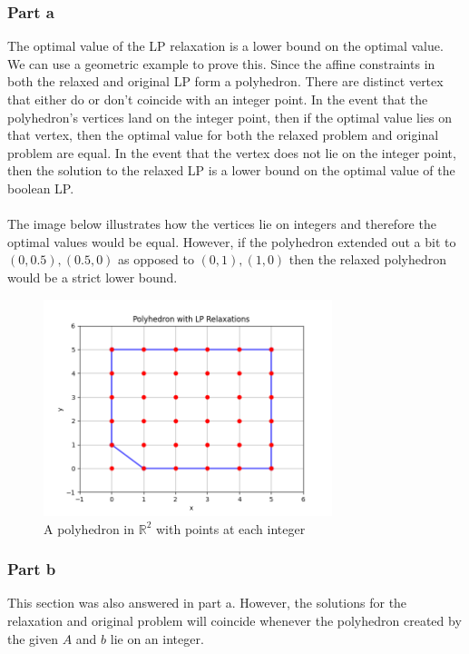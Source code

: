\subsubsection{Part a}
The optimal value of the LP relaxation is a lower bound on the optimal value. We can use a geometric example to prove this. Since the affine constraints in both the relaxed and original LP form a polyhedron. There are distinct vertex that either do or don't coincide with an integer point. In the event that the polyhedron's vertices land on the integer point, then if the optimal value lies on that vertex, then the optimal value for both the relaxed problem and original problem are equal. In the event that the vertex does not lie on the integer point, then the solution to the relaxed LP is a lower bound on the optimal value of the boolean LP.  \\ \\
The image below illustrates how the vertices lie on integers and therefore the optimal values would be equal. However, if the polyhedron extended out a bit to $(0,0.5),(0.5,0)$ as opposed to $(0,1),(1,0)$ then the relaxed polyhedron would be a strict lower bound.
\begin{figure}[htbp]
  \centerline{\includegraphics[width=0.75\textwidth]{hw5/lp_relaxed_polyhedron.png}}
  \caption{A polyhedron in $\mathbb{R}^2$ with points at each integer}
  \label{fig:lp_relaxed_polyhedron}
\end{figure} 
\subsubsection{Part b}
This section was also answered in part a. However, the solutions for the relaxation and original problem will coincide whenever the polyhedron created by the given $A$ and $b$ lie on an integer.